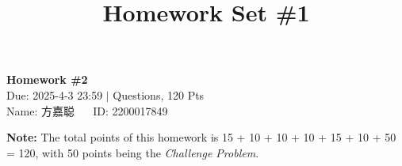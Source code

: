 \documentclass[11pt]{article}
\title{Homework Set \#1}
\newcommand\1{\mathds{1}}
\begin{document}
    \pagestyle{fancy}
    \chead{\kaishu }
    \fancyfoot[R]{} 
    \fancyfoot[C]{\thepage\ /\ \pageref{LastPage} \\ \textcolor{lightgray}{Last Compile: \today}}

    \begin{center}
      {\LARGE \bf Homework \#2}\\
      {Due: 2025-4-3 23:59 \quad$|$ Questions, 120 Pts}\\
        {Name: \kaishu 方嘉聪 $\quad$ ID: 2200017849}
    \end{center}

    \textbf{Note: }The total points of this homework is 15 + 10 + 10 + 10 + 15 + 10 + 50 = 120, with 50 points being the \textit{Challenge Problem}.  

    
    \clearpage
    
    \clearpage
    
    \clearpage
    
    \clearpage 
    
    \clearpage
    
    \clearpage
    
    \clearpage
    
\end{document}
